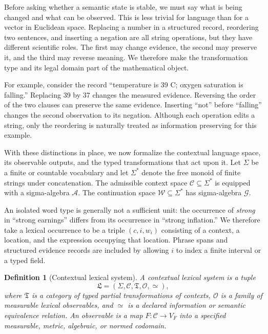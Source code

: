 \documentclass[11pt]{article}
\newtheorem{definition}{Definition}[section]
\newcommand{\Ctxt}{\mathcal C}
\newcommand{\Words}{\mathcal W}
\newcommand{\Trans}{\mathfrak T}
\begin{document}
Before asking whether a semantic state is stable, we must say what is being
changed and what can be observed.  This is less trivial for language than for
a vector in Euclidean space.  Replacing a number in a structured record,
reordering two sentences, and inserting a negation are all string operations,
but they have different scientific roles.  The first may change evidence, the
second may preserve it, and the third may reverse meaning.  We therefore make
the transformation type and its legal domain part of the mathematical object.

For example, consider the record ``temperature is 39 C; oxygen saturation is
falling.''  Replacing 39 by 37 changes the measured evidence.  Reversing the
order of the two clauses can preserve the same evidence.  Inserting
``not'' before ``falling'' changes the second observation to its negation.
Although each operation edits a string, only the reordering is naturally
treated as information preserving for this example.

With these distinctions in place, we now formalize the contextual language
space, its observable outputs, and the typed transformations that act upon it.
Let $\Sigma$ be a finite or countable vocabulary and let $\Sigma^*$ denote the free monoid of finite strings under concatenation. The admissible context space $\Ctxt\subseteq\Sigma^*$ is equipped with a sigma-algebra $\mathcal A$. The continuation space $\Words\subseteq\Sigma^*$ has sigma-algebra $\mathcal G$.

An isolated word type is generally not a sufficient unit: the occurrence of \emph{strong} in ``strong earnings'' differs from its occurrence in ``strong inflation.'' We therefore take a lexical occurrence to be a triple $(c,i,w_i)$ consisting of a context, a location, and the expression occupying that location. Phrase spans and structured evidence records are included by allowing $i$ to index a finite interval or a typed field.

\begin{definition}[Contextual lexical system]
A contextual lexical system is a tuple
\[
 \mathfrak L=(\Sigma,\Ctxt,\Trans,\mathcal O,\simeq),
\]
where $\Trans$ is a category of typed partial transformations of contexts, $\mathcal O$ is a family of measurable lexical observables, and $\simeq$ is a declared information or semantic equivalence relation. An observable is a map $F:\Ctxt\to V_F$ into a specified measurable, metric, algebraic, or normed codomain.
\end{definition}
\end{document}
